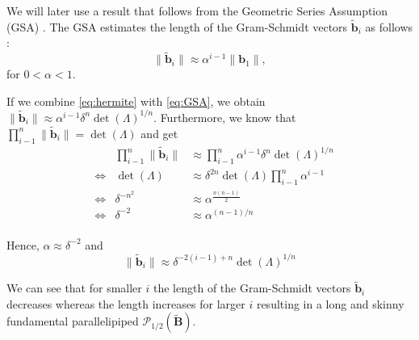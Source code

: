 We will later use a result that follows from the Geometric Series Assumption (GSA) \cite{Gop16}. The GSA estimates the length of the Gram-Schmidt vectors $\tilde{\mathbf{b}}_i$ as follows \cite{Sch03}: \label{sec:GSA} %
\begin{equation} \label{eq:GSA}
  \| \tilde{\mathbf{b}}_i \| \approx \alpha^{i-1} \| \mathbf{b}_1 \|,
\end{equation}
for $0 < \alpha < 1$.

If we combine \cref{eq:hermite} with \cref{eq:GSA}, we obtain  $\| \tilde{\mathbf{b}}_i \| \approx \alpha^{i-1} \delta^n \det(\Lambda)^{1/n}$. Furthermore, we know that $\prod_{i-1}^n \| \tilde{\mathbf{b}}_i \| = \det(\Lambda)$  %
and get
\begin{align}
   &      & \prod_{i-1}^n \| \tilde{\mathbf{b}}_i \| & \approx \prod_{i-1}^n \alpha^{i-1} \delta^n \det(\Lambda)^{1/n} \\
   & \iff & \det(\Lambda)                            & \approx \delta^{2n} \det(\Lambda) \prod_{i-1}^n \alpha^{i-1}    \\
   & \iff & \delta^{-n^2}                            & \approx \alpha^{\frac{n(n-1)}{2}}                               \\
   & \iff & \delta^{-2}                              & \approx \alpha^{(n-1)/n}                                        \\
\end{align}

Hence, $\alpha \approx \delta^{-2}$ and
\begin{equation}
  \| \tilde{\mathbf{b}}_i \| \approx \delta^{-2(i-1) + n} \det(\Lambda)^{1/n}
\end{equation}

We can see that for smaller $i$ the length of the Gram-Schmidt vectors $\tilde{\mathbf{b}}_i$ decreases whereas the length increases for larger $i$ resulting in a long and skinny fundamental parallelipiped $\mathcal{P}_{1/2}(\tilde{\mathbf{B}})$.






